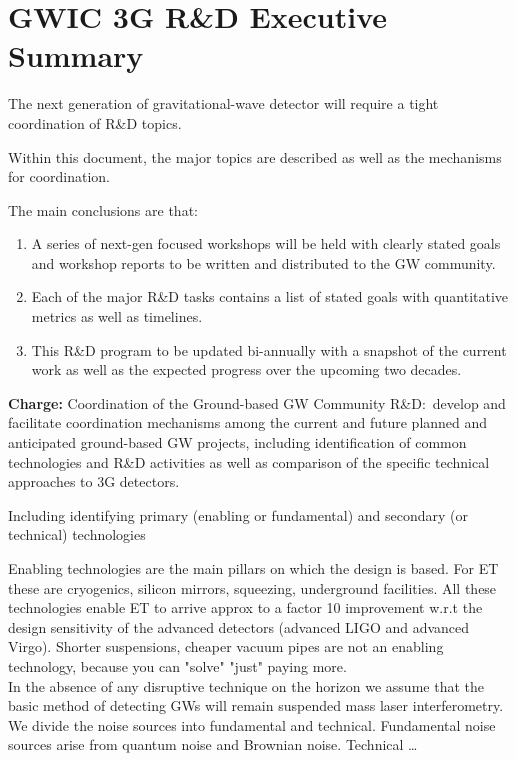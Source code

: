 \section{GWIC 3G R\&D Executive Summary}
\label{sec:Exec}


The next generation of gravitational-wave detector will require a tight coordination of R\&D topics.

Within this document, the major topics are described as well as the mechanisms for coordination.

The main conclusions are that:
\begin{enumerate}
\item A series of next-gen focused workshops will be held with clearly stated goals and workshop reports to be written and distributed to the GW community.

\item Each of the major R\&D tasks contains a list of stated goals with quantitative metrics as well as timelines.

\item This R\&D program to be updated bi-annually with a snapshot of the current work as well as the expected progress over the upcoming two decades.
\end{enumerate}

\textbf{Charge:} Coordination of the Ground-based GW Community R\&D:~develop and facilitate coordination mechanisms among the current and future planned and anticipated ground-based GW projects, including identification of common technologies and R\&D activities as well as comparison of the specific technical approaches to 3G detectors.

Including identifying primary (enabling or fundamental) and secondary (or technical) technologies \\


\noindent 

\noindent Enabling technologies are the main pillars on which the design is based. For ET these are cryogenics, silicon mirrors, squeezing, underground facilities. All these technologies enable ET to arrive approx to a factor 10 improvement w.r.t the design sensitivity of the advanced detectors (advanced LIGO and advanced Virgo). Shorter suspensions, cheaper vacuum pipes are not an enabling technology, because you can "solve" "just" paying more.\\

In the absence of any disruptive technique on the horizon we assume that the basic method of detecting GWs will remain suspended mass laser interferometry.  We divide the noise sources into fundamental and technical.    Fundamental noise sources arise from quantum  noise and Brownian noise.  Technical {\dots}

